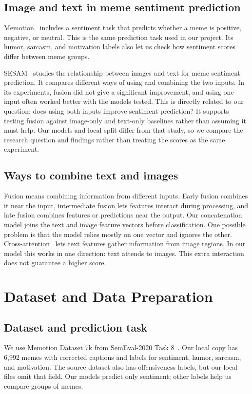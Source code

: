 \documentclass[11pt,a4paper]{article}
\begin{document}
\subsection{Image and text in meme sentiment prediction}
Memotion~\cite{sharma2020semeval} includes a sentiment task that predicts whether a meme is positive, negative, or neutral. This is the same prediction task used in our project. Its humor, sarcasm, and motivation labels also let us check how sentiment scores differ between meme groups.

SESAM~\cite{bonheme2020sesam} studies the relationship between images and text for meme sentiment prediction. It compares different ways of using and combining the two inputs. In its experiments, fusion did not give a significant improvement, and using one input often worked better with the models tested. This is directly related to our question: does using both inputs improve sentiment prediction? It supports testing fusion against image-only and text-only baselines rather than assuming it must help. Our models and local split differ from that study, so we compare the research question and findings rather than treating the scores as the same experiment.

\subsection{Ways to combine text and images}
Fusion means combining information from different inputs. Early fusion combines it near the input, intermediate fusion lets features interact during processing, and late fusion combines features or predictions near the output. Our concatenation model joins the text and image feature vectors before classification. One possible problem is that the model relies mostly on one vector and ignores the other. Cross-attention~\cite{vaswani2017attention} lets text features gather information from image regions. In our model this works in one direction: text attends to images. This extra interaction does not guarantee a higher score.

\section{Dataset and Data Preparation}
\label{sec:dataset}

\subsection{Dataset and prediction task}
We use Memotion Dataset 7k from SemEval-2020 Task 8~\cite{sharma2020semeval}. Our local copy has 6{,}992 memes with corrected captions and labels for sentiment, humor, sarcasm, and motivation. The source dataset also has offensiveness labels, but our local files omit that field. Our models predict only sentiment; other labels help us compare groups of memes.
\end{document}
